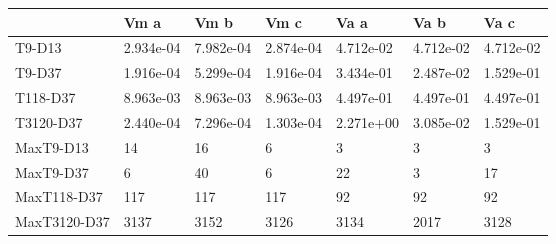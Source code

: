\begin{tabular}{lllllll}
\toprule
{} &       Vm a &       Vm b &       Vm c &       Va a &       Va b &       Va c \\
\midrule
T9-D13       &  2.934e-04 &  7.982e-04 &  2.874e-04 &  4.712e-02 &  4.712e-02 &  4.712e-02 \\
T9-D37       &  1.916e-04 &  5.299e-04 &  1.916e-04 &  3.434e-01 &  2.487e-02 &  1.529e-01 \\
T118-D37     &  8.963e-03 &  8.963e-03 &  8.963e-03 &  4.497e-01 &  4.497e-01 &  4.497e-01 \\
T3120-D37    &  2.440e-04 &  7.296e-04 &  1.303e-04 &  2.271e+00 &  3.085e-02 &  1.529e-01 \\
MaxT9-D13    &         14 &         16 &          6 &          3 &          3 &          3 \\
MaxT9-D37    &          6 &         40 &          6 &         22 &          3 &         17 \\
MaxT118-D37  &        117 &        117 &        117 &         92 &         92 &         92 \\
MaxT3120-D37 &       3137 &       3152 &       3126 &       3134 &       2017 &       3128 \\
\bottomrule
\end{tabular}
